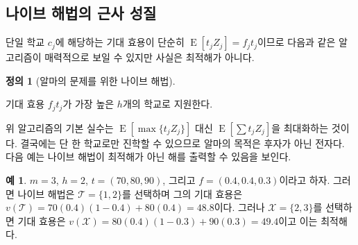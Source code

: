 \documentclass[11pt]{article} %
\newif\ifen
\theoremstyle{definition}
\newtheorem{example}{Example}
\newtheorem{definition}{Definition}
\theoremstyle{definition}
\newtheorem{example}{예}
\newtheorem{definition}{정의}
\begin{document}
\ifen \subsection{Approximation properties of a na\"ive solution}  \else \subsection{나이브 해법의 근사 성질} \fi
\ifen
The expected utility associated with a single school $c_j$ is simply $\operatorname{E}[t_j Z_j] = f_j t_j$. It is therefore tempting to adopt the following strategy, which turns out to be inoptimal.
\else 
단일 학교 $c_j$에 해당하는 기대 효용이 단순히 $\operatorname{E}[t_j Z_j] = f_j t_j$이므로 다음과 같은 알고리즘이 매력적으로 보일 수 있지만 사실은 최적해가 아니다.
\fi
\begin{definition}[\ifen Na\"ive algorithm for Alma’s problem\else 알마의 문제를 위한 나이브 해법\fi] \label{naivealgorithm}
\ifen 
Apply to the $h$ schools having the highest expected utility $f_j t_j$.
\else
기대 효용 $f_j t_j$가 가장 높은 $h$개의 학교로 지원한다.
\fi
\end{definition}
\ifen 
The basic error of this algorithm is that it maximizes $\operatorname{E}\left[\sum t_j Z_j \right]$ instead of $\operatorname{E}\left[\max \{t_j Z_j\} \right]$. The latter is what Alma is truly concerned with, since in the end she can attend only one school. The following example shows that the na\"ive algorithm can produce a suboptimal solution.
\else
위 알고리즘의 기본 실수는 $\operatorname{E}\left[\max \{t_j Z_j\} \right]$ 대신  $\operatorname{E}\left[\sum t_j Z_j \right]$을 최대화하는 것이다. 결국에는 단 한 학교로만 진학할 수 있으므로 알마의 목적은 후자가 아닌 전자다. %
다음 예는 나이브 해법이 최적해가 아닌 해를 출력할 수 있음을 보인다.
\fi
\begin{example}
\ifen 
Suppose $m=3$, $h=2$,  $ t= (70, 80, 90) $, and $f = (0.4, 0.4, 0.3)$. 
Then the na\"ive algorithm picks $\mathcal{T} = \{1, 2\}$ with 
$v(\mathcal{T}) = 70(0.4)(1-0.4) + 80(0.4) = 48.8$.
But $\mathcal{X} = \{2, 3\}$ with
$v(\mathcal{X}) = 80(0.4)(1-0.3) + 90(0.3) = 49.4$
is the optimal solution. 
\else
$m=3$, $h=2$,  $ t= (70, 80, 90) $, 그리고 $f = (0.4, 0.4, 0.3)$이라고 하자. 그러면 나이브 해법은 $\mathcal{T} = \{1, 2\}$를 선택하며 그의 기대 효용은 $v(\mathcal{T}) = 70(0.4)(1-0.4) + 80(0.4) = 48.8$이다. 그러나 $\mathcal{X} = \{2, 3\}$를 선택하면 기대 효용은 $v(\mathcal{X}) = 80(0.4)(1-0.3) + 90(0.3) = 49.4$이고 이는 최적해다.
\fi
\end{example}
\end{document}
